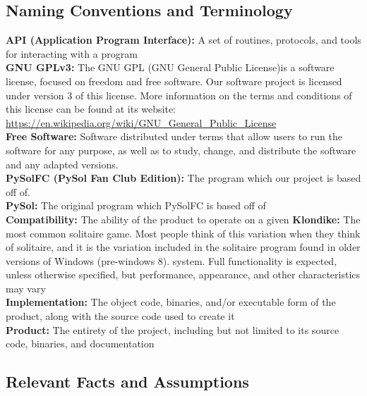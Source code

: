 \documentclass[12pt, titlepage]{article}
\begin{document}
		\subsection{Naming Conventions and Terminology}
		\textbf {API (Application Program Interface):} A set of routines, 
		protocols, and tools for interacting with a program\\
		\textbf {GNU GPLv3:} The GNU GPL (GNU General Public License)is a 
		software license, focused on freedom and free software.  Our software 
		project is licensed under version 3 of this license.  More information 
		on the terms and conditions of this license can be found at its 
		website: 
		\url{https://en.wikipedia.org/wiki/GNU_General_Public_License}\\
		\textbf {Free Software:} Software distributed under terms that allow 
		users to run the software for any purpose, as well as to study, change, 
		and distribute the software and any adapted versions.\\
		\textbf {PySolFC (PySol Fan Club Edition):} The program which our 
		project is based off of.\\
		\textbf {PySol:} The original program which PySolFC is based off of\\
		\textbf {Compatibility:} The ability of the product to operate on a 
		given
		\textbf{Klondike:} The most common solitaire game.  Most people think 
		of this variation when they think of solitaire, and it is the variation 
		included in the solitaire program found in older versions of Windows 
		(pre-windows 8).
		system. Full functionality is expected, unless otherwise specified, but
		performance, appearance, and other characteristics may vary\\
		\textbf {Implementation:} The object code, binaries, and/or executable form
		of the product, along with the source code used to create it\\
		\textbf {Product:} The entirety of the project, including but not limited to
		its source code, binaries, and documentation\\
		
		\subsection{Relevant Facts and Assumptions}
		
\end{document}
